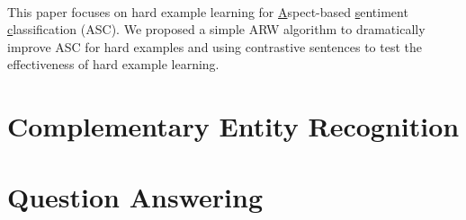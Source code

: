 \\
This paper focuses on hard example learning for \underline{A}spect-based \underline{s}entiment \underline{c}lassification (ASC).
We proposed a simple ARW algorithm to dramatically improve ASC for hard examples and using contrastive sentences to test the effectiveness of hard example learning.

\section{Complementary Entity Recognition}


\section{Question Answering}
\label{chap6:sec:qa}

